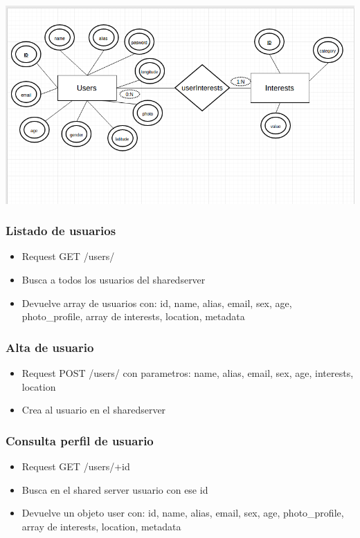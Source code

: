 \documentclass[letterpaper,10pt,english]{sphinxmanual}
\begin{document}
\includegraphics{derShared.png}


\subsubsection{Listado de usuarios}
\label{manuals:listado-de-usuarios}\begin{itemize}
\item {} 
Request GET /users/

\item {} 
Busca a todos los usuarios del sharedserver

\item {} 
Devuelve array de usuarios con: id, name, alias, email, sex, age, photo\_profile, array de interests, location, metadata

\end{itemize}


\subsubsection{Alta de usuario}
\label{manuals:alta-de-usuario}\begin{itemize}
\item {} 
Request POST /users/ con parametros: name, alias, email, sex, age, interests, location

\item {} 
Crea al usuario  en el sharedserver

\end{itemize}


\subsubsection{Consulta perfil de usuario}
\label{manuals:consulta-perfil-de-usuario}\begin{itemize}
\item {} 
Request GET /users/+id

\item {} 
Busca en el shared server usuario con ese id

\item {} 
Devuelve un objeto user con: id, name, alias, email, sex, age, photo\_profile, array de interests, location, metadata

\end{itemize}
\end{document}
